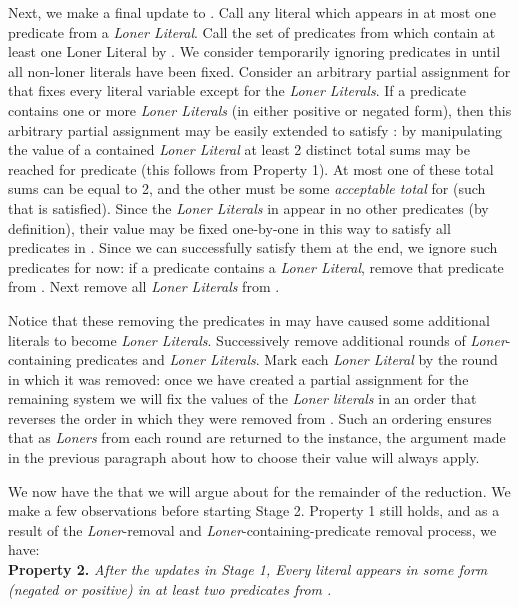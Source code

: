 \documentclass{article}
\begin{document}
Next, we make a final update to  . Call any literal  which appears in at most one predicate from  a \textit{Loner Literal}. Call the set of predicates from  which contain at least one Loner Literal by . We consider temporarily ignoring predicates in  until all non-loner literals have been fixed. Consider an arbitrary partial assignment for  that fixes every literal variable except for the \textit{Loner Literals}. If a predicate   contains one or more \textit{Loner Literals} (in either positive or negated form), then this arbitrary partial assignment may be easily extended to satisfy : by manipulating the  value of a contained \textit{Loner Literal} at least 2 distinct total sums may be reached for predicate  (this follows from Property 1). At most one of these total sums can be equal to 2, and the other must be some \textit{acceptable total} for  (such that  is satisfied). Since the \textit{Loner Literals} in  appear in no other predicates (by definition), their value may be fixed one-by-one in this way to satisfy all predicates in . Since we can successfully satisfy them at the end, we ignore such predicates for now: if a predicate contains a \textit{Loner Literal}, remove that predicate from . Next remove all \textit{Loner Literals} from . 

Notice that these removing the predicates in  may have caused some additional literals to become \textit{Loner Literals}. Successively remove additional rounds of \textit{Loner}-containing predicates and \textit{Loner Literals}. Mark each \textit{Loner Literal} by the round in which it was removed: once we have created a partial assignment for the remaining system we will fix the values of the \textit{Loner literals} in an order that reverses the order in which they were removed from . Such an ordering ensures that as \textit{Loners} from each round are returned to the instance, the argument made in the previous paragraph about how to choose their value will always apply. 



We now have the  that we will argue about for the remainder of the reduction.  We make a few observations before starting Stage 2. Property 1 still holds, and as a result of the \textit{Loner}-removal and \textit{Loner}-containing-predicate removal process, we have:\\

\noindent \textbf{Property 2.} \textit{After the updates in Stage 1, Every literal  appears in some form (negated or positive) in at least two predicates from .}\\
\end{document}
